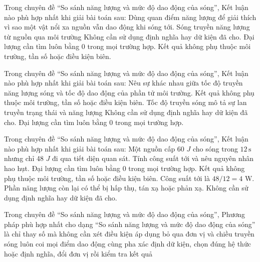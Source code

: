 \begin{ex}
Trong chuyên đề “So sánh năng lượng và mức độ dao động của sóng”, Kết luận nào phù hợp nhất khi giải bài toán sau: Dùng quan điểm năng lượng để giải thích vì sao một vật nổi xa nguồn vẫn dao động khi sóng tới.
\choice
{\True Sóng truyền năng lượng từ nguồn qua môi trường}
{Không cần sử dụng định nghĩa hay dữ kiện đã cho.}
{Đại lượng cần tìm luôn bằng 0 trong mọi trường hợp.}
{Kết quả không phụ thuộc môi trường, tần số hoặc điều kiện biên.}
\end{ex}

\begin{ex}
Trong chuyên đề “So sánh năng lượng và mức độ dao động của sóng”, Kết luận nào phù hợp nhất khi giải bài toán sau: Nêu sự khác nhau giữa tốc độ truyền năng lượng sóng và tốc độ dao động của phần tử môi trường.
\choice
{Kết quả không phụ thuộc môi trường, tần số hoặc điều kiện biên.}
{\True Tốc độ truyền sóng mô tả sự lan truyền trạng thái và năng lượng}
{Không cần sử dụng định nghĩa hay dữ kiện đã cho.}
{Đại lượng cần tìm luôn bằng 0 trong mọi trường hợp.}
\end{ex}

\begin{ex}
Trong chuyên đề “So sánh năng lượng và mức độ dao động của sóng”, Kết luận nào phù hợp nhất khi giải bài toán sau: Một nguồn cấp 60 $J$ cho sóng trong $12\,\text{s}$ nhưng chỉ 48 $J$ đi qua tiết diện quan sát. Tính công suất tới và nêu nguyên nhân hao hụt.
\choice
{Đại lượng cần tìm luôn bằng 0 trong mọi trường hợp.}
{Kết quả không phụ thuộc môi trường, tần số hoặc điều kiện biên.}
{\True Công suất tới là $48/12=4$ W. Phần năng lượng còn lại có thể bị hấp thụ, tán xạ hoặc phản xạ.}
{Không cần sử dụng định nghĩa hay dữ kiện đã cho.}
\end{ex}

\begin{ex}
Trong chuyên đề “So sánh năng lượng và mức độ dao động của sóng”, Phương pháp phù hợp nhất cho dạng “So sánh năng lượng và mức độ dao động của sóng” là
\choice
{chỉ thay số mà không cần xét điều kiện áp dụng}
{bỏ qua đơn vị và chiều truyền sóng}
{luôn coi mọi điểm dao động cùng pha}
{\True xác định dữ kiện, chọn đúng hệ thức hoặc định nghĩa, đổi đơn vị rồi kiểm tra kết quả}
\end{ex}

